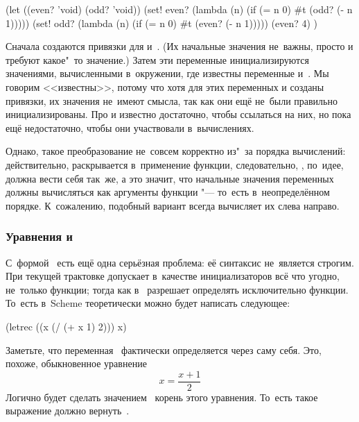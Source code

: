 \begin{code:lisp}
(let ((even? 'void) (odd? 'void))
  (set! even? (lambda (n) (if (= n 0) #t (odd? (- n 1)))))
  (set! odd? (lambda (n) (if (= n 0) #t (even? (- n 1)))))
  (even? 4) )
\end{code:lisp}

Сначала создаются привязки для  и~. (Их начальные значения
не~важны, просто  и  требуют какое"~то значение.) Затем эти
переменные инициализируются значениями, вычисленными в~окружении, где известны
переменные  и~. Мы говорим <<известны>>, потому что хотя для
этих переменных и созданы привязки, их значения не~имеют смысла, так как они
ещё не~были правильно инициализированы. Про  и  известно
достаточно, чтобы ссылаться на них, но пока ещё недостаточно, чтобы они
участвовали в~вычислениях.

Однако, такое преобразование не~совсем корректно из"~за порядка вычислений:
действительно,  раскрывается в~применение функции, следовательно,
, по~идее, должна вести себя так~же, а это значит, что начальные
значения переменных должны вычисляться как аргументы функции "--- то~есть
в~неопределённом порядке. К~сожалению, подобный вариант всегда вычисляет их
слева направо. 


\subsubsection{\texorpdfstring{Уравнения и~\protect{}}%
{Уравнения и letrec}}

С~формой~ есть ещё одна серьёзная проблема: её синтаксис не~является
строгим. При текущей трактовке  допускает в~качестве инициализаторов
всё что угодно, не~только функции; тогда как  в~{\CommonLisp}
разрешает определять исключительно функции. То~есть в~Scheme теоретически можно
будет написать следующее:

\begin{code:lisp}
(letrec ((x (/ (+ x 1) 2))) x)
\end{code:lisp}

Заметьте, что переменная~ фактически определяется через саму себя. Это,
похоже, обыкновенное уравнение
%
\[  x = \frac{x + 1}{2}  \]
%
Логично будет сделать значением~ корень этого уравнения. То~есть такое
выражение должно вернуть~.

